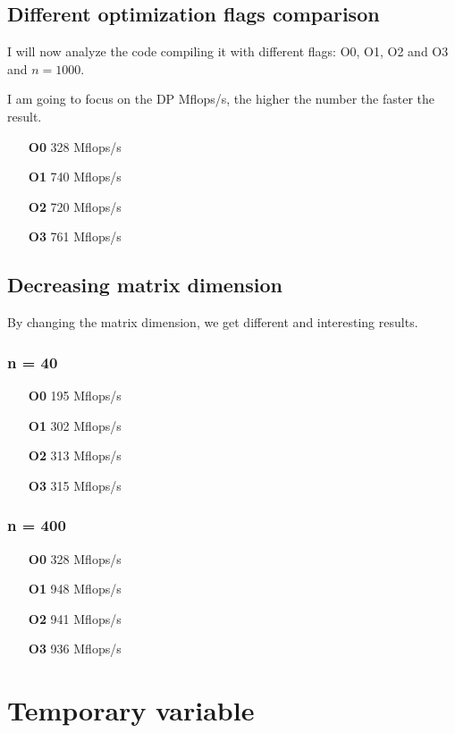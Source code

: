 \documentclass[11pt,a4paper,oneside,titlepage,openright]{book}
\begin{document}
 
\section{Different optimization flags comparison}
I will now analyze the code compiling it with different flags: O0, O1, O2 and O3 and $n = 1000$.

I am going to focus on the DP Mflops/s, the higher the number the faster the result. 
\begin{itemize}
\item[\textbf{O0}] 328  Mflops/s
\item[\textbf{O1}] 740 Mflops/s
\item[\textbf{O2}] 720 Mflops/s
\item[\textbf{O3}] 761 Mflops/s
\end{itemize}


\section{Decreasing matrix dimension} 
By changing the matrix dimension, we get different and interesting results. 

\subsection{ n = 40}

\begin{itemize}
\item[\textbf{O0}] 195 Mflops/s
\item[\textbf{O1}] 302 Mflops/s
\item[\textbf{O2}] 313 Mflops/s
\item[\textbf{O3}] 315 Mflops/s
\end{itemize}


\subsection{ n = 400}

\begin{itemize}
\item[\textbf{O0}] 328  Mflops/s
\item[\textbf{O1}] 948 Mflops/s
\item[\textbf{O2}] 941 Mflops/s
\item[\textbf{O3}] 936 Mflops/s
\end{itemize}




\chapter{Temporary variable}
\end{document}
